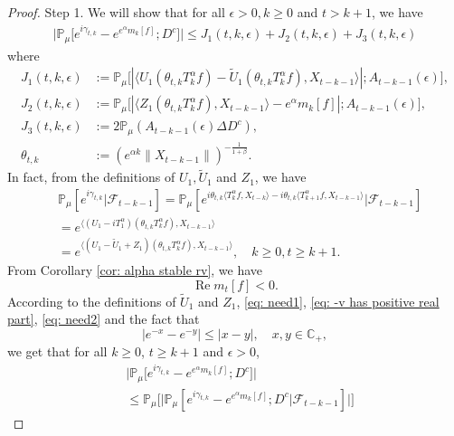 \documentclass[12pt]{amsart}
\theoremstyle{plain}
\theoremstyle{definition}
\numberwithin{equation}{section}
\begin{document}
\begin{proof}
	Step 1. We will show that for all $\epsilon > 0, k\geq 0$ and $t>k+1$, we have
\begin{align}
    \big|\mathbb{P}_{\mu}\big[e^{i\gamma_{t,k}}-e^{e^{\alpha}m_k[f]}; D^c\big]\big|
    \leq J_1(t,k,\epsilon)+J_2(t,k,\epsilon)+J_3(t,k,\epsilon)
\end{align}
	where
\begin{align}
\label{eq: Def of Ji}
	J_1(t,k,\epsilon)
	&:= \mathbb{P}_{\mu}\big[|\langle U_1(\theta_{t,k}T_k^{\alpha}f)-\tilde U_1(\theta_{t,k}T_k^{\alpha}f), X_{t-k-1}\rangle|; A_{t-k-1}(\epsilon) \big],
	\\ J_2(t,k,\epsilon)
	&:= \mathbb{P}_{\mu}\big[|\langle Z_1(\theta_{t,k}T_k^{\alpha}f),X_{t-k-1}\rangle-e^{\alpha}m_k[f]|; A_{t-k-1}(\epsilon)\big],
	\\ J_3(t,k, \epsilon)
	&:=2\mathbb{P}_{\mu}(A_{t-k-1}(\epsilon)\Delta D^c),
	\\\theta_{t,k}
	&:= (e^{\alpha k}\|X_{t-k-1}\|)^{-\frac{1}{1+\beta}}.
\end{align}
In fact, from the definitions of $U_1, \tilde U_1$ and $Z_1$, we have
\begin{align}
\label{eq: need1}
    &\mathbb{P}_{\mu}[e^{i\gamma_{t,k}}|\mathscr{F}_{t-k-1}]
    =\mathbb{P}_{\mu}[e^{i\theta_{t,k}\langle T_k^{\alpha}f,X_{t-k}\rangle-i\theta_{t,k}\langle T_{k+1}^{\alpha}f, X_{t-k-1}\rangle}|\mathscr{F}_{t-k-1}]
    \\&=e^{\langle (U_1 - iT_{1}^{\alpha}) (\theta_{t,k}T_k^{\alpha}f),X_{t-k-1}\rangle}
    \\&=e^{\langle (U_1 - \tilde U_1+Z_1) (\theta_{t,k}T_k^{\alpha}f),X_{t-k-1}\rangle},
    \quad k\geq 0, t\geq k+1.
\end{align}
	From Corollary \ref{cor: alpha stable rv}, we have
\begin{equation}
\label{eq: need2}
	\operatorname {Re} m_t[f] < 0.
\end{equation}
    According to the definitions of $\tilde U_1$ and $Z_1$, \eqref{eq: need1}, \eqref{eq: -v has positive real part}, \eqref{eq: need2} and the fact that
\[
	|e^{-x} - e^{-y}| \leq |x-y|,\quad x,y \in \mathbb C_+,
\]
	we get that for all $k\geq 0$, $t\geq k+1$ and $\epsilon> 0$,
\begin{align}
\label{eq: inequality that will used later}
    &\big|\mathbb{P}_{\mu}\big[e^{i\gamma_{t,k}}-e^{e^{\alpha}m_k[f]}; D^c\big]\big|
    \\& \leq \mathbb{P}_{\mu}\Big[\big| \mathbb{P}_{\mu}[e^{i\gamma_{t,k}}-e^{e^{\alpha}m_k[f]}; D^c | \mathscr F_{t-k-1}]\big|\Big]

\end{align}
\end{proof}
\end{document}
